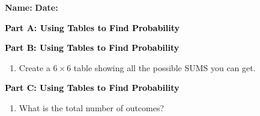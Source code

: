 \documentclass[12pt, letterpaper, fleqn]{article}
\newcommand{\blank}{\underline{\hspace{2.2cm}}}
\begin{document}
\textbf{Name:} \underline{\hspace{5cm}}
\hfill
\textbf{Date:} \underline{\hspace{3cm}}\\

\begin{tcolorbox}[colback=customteal!20]
\large\textcolor{black}{\textbf{Part A: Using Tables to Find Probability}}
\end{tcolorbox}

\vspace{3mm}


\newpage

\begin{tcolorbox}[colback=customteal!20]
\large\textcolor{black}{\textbf{Part B: Using Tables to Find Probability}}
\end{tcolorbox}

\vspace{3mm}

\begin{enumerate}[itemsep=2.5cm, leftmargin=0.6cm, resume]
\item Create a $6 \times 6$ table showing all the possible SUMS you can get.
\end{enumerate}

\newpage

\begin{tcolorbox}[colback=customteal!20]
\large\textcolor{black}{\textbf{Part C: Using Tables to Find Probability}}
\end{tcolorbox}

\vspace{3mm}

\begin{enumerate}[itemsep=2.5cm, leftmargin=0.6cm, resume]
\item What is the total number of outcomes? \blank
\end{enumerate}

\newpage
\end{document}
